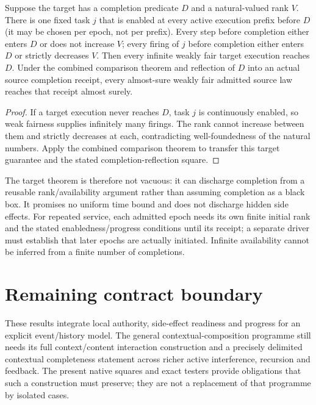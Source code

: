 \documentclass[11pt]{article}
\begin{document}
\begin{proposition}
Suppose the target has a completion predicate $D$ and a natural-valued rank $V$. There is one fixed task $j$ that is enabled at every active execution prefix before $D$ (it may be chosen per epoch, not per prefix). Every step before completion either enters $D$ or does not increase $V$; every firing of $j$ before completion either enters $D$ or strictly decreases $V$. Then every infinite weakly fair target execution reaches $D$. Under the combined comparison theorem and reflection of $D$ into an actual source completion receipt, every almost-sure weakly fair admitted source law reaches that receipt almost surely.
\end{proposition}
\begin{proof}
If a target execution never reaches $D$, task $j$ is continuously enabled, so weak fairness supplies infinitely many firings. The rank cannot increase between them and strictly decreases at each, contradicting well-foundedness of the natural numbers. Apply the combined comparison theorem to transfer this target guarantee and the stated completion-reflection square.
\end{proof}

The target theorem is therefore not vacuous: it can discharge completion from a reusable rank/availability argument rather than assuming completion as a black box. It promises no uniform time bound and does not discharge hidden side effects. For repeated service, each admitted epoch needs its own finite initial rank and the stated enabledness/progress conditions until its receipt; a separate driver must establish that later epochs are actually initiated. Infinite availability cannot be inferred from a finite number of completions.

\section{Remaining contract boundary}
These results integrate local authority, side-effect readiness and progress for an explicit event/history model. The general contextual-composition programme still needs its full context/content interaction construction and a precisely delimited contextual completeness statement across richer active interference, recursion and feedback. The present native squares and exact testers provide obligations that such a construction must preserve; they are not a replacement of that programme by isolated cases.
\end{document}
